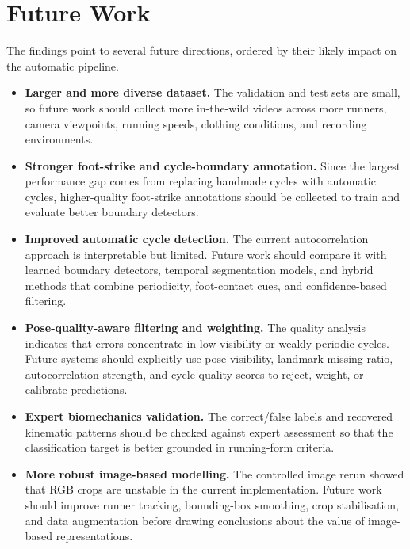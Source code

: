 \section{Future Work}
\label{sec:concl-future}

The findings point to several future directions, ordered by their likely impact
on the automatic pipeline.

\begin{itemize}
    \item \textbf{Larger and more diverse dataset.} The validation and test sets
    are small, so future work should collect more in-the-wild videos across
    more runners, camera viewpoints, running speeds, clothing conditions,
    and recording environments.
    
    \item \textbf{Stronger foot-strike and cycle-boundary annotation.} Since the
    largest performance gap comes from replacing handmade cycles with
    automatic cycles, higher-quality foot-strike annotations should be
    collected to train and evaluate better boundary detectors.
    
    \item \textbf{Improved automatic cycle detection.} The current
    autocorrelation approach is interpretable but limited. Future work
    should compare it with learned boundary detectors, temporal
    segmentation models, and hybrid methods that combine periodicity,
    foot-contact cues, and confidence-based filtering.
    
    \item \textbf{Pose-quality-aware filtering and weighting.} The quality
    analysis indicates that errors concentrate in low-visibility or weakly
    periodic cycles. Future systems should explicitly use pose visibility,
    landmark missing-ratio, autocorrelation strength, and cycle-quality
    scores to reject, weight, or calibrate predictions.
    
    \item \textbf{Expert biomechanics validation.} The correct/false labels and
    recovered kinematic patterns should be checked against expert assessment
    so that the classification target is better grounded in running-form
    criteria.
    
    \item \textbf{More robust image-based modelling.} The controlled image rerun
    showed that RGB crops are unstable in the current implementation.
    Future work should improve runner tracking, bounding-box smoothing,
    crop stabilisation, and data augmentation before drawing conclusions
    about the value of image-based representations.
    

\end{itemize}
